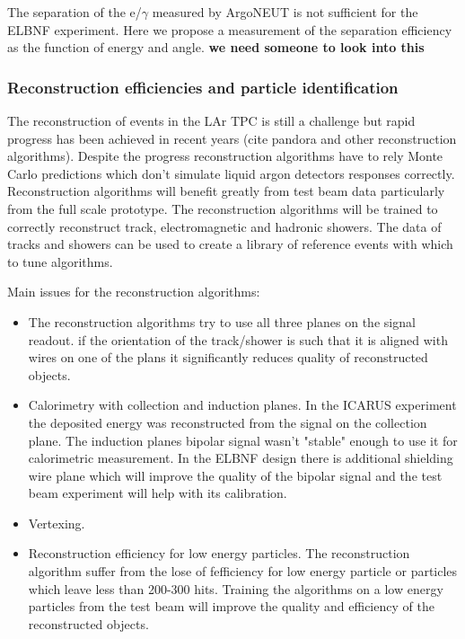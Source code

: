 The separation of  the e/$\gamma$ measured by ArgoNEUT is not sufficient for the ELBNF experiment. Here we propose a measurement of the separation efficiency  as the function of energy and angle.  {\bf we need someone to look into this}



\subsubsection{Reconstruction efficiencies and particle identification}
\label{detbeam_pid}

The reconstruction of events in the LAr TPC is still a challenge but rapid progress has been achieved in recent years (cite pandora and other reconstruction algorithms). Despite the progress reconstruction algorithms have to rely Monte Carlo predictions which don't simulate liquid argon detectors responses correctly. Reconstruction algorithms will benefit greatly from test beam data particularly from the full scale prototype. The reconstruction algorithms will be trained to correctly reconstruct track, electromagnetic and hadronic showers.
The data of tracks and showers can be used to create a library of reference events with which to tune algorithms.

Main issues for the reconstruction algorithms:
\begin{itemize}
\item The reconstruction algorithms try to use all three planes on the signal readout. if the orientation of the track/shower is such that it is aligned with wires on one of the plans it significantly reduces quality of reconstructed objects. 
\item Calorimetry with collection and induction planes. In the ICARUS experiment the deposited energy was reconstructed from the signal on the collection plane. The induction planes bipolar signal wasn't "stable" enough to use it for calorimetric measurement. In the ELBNF design there is additional shielding  wire plane which will improve the quality of the bipolar signal and the  test beam experiment will help with its calibration.
\item   Vertexing.
\item Reconstruction efficiency for low energy particles. The reconstruction algorithm suffer from the lose of fefficiency for low energy particle or particles which leave less than 200-300 hits. Training the algorithms on a low energy particles from the test beam will improve the quality and efficiency of the reconstructed objects.
\end{itemize}



